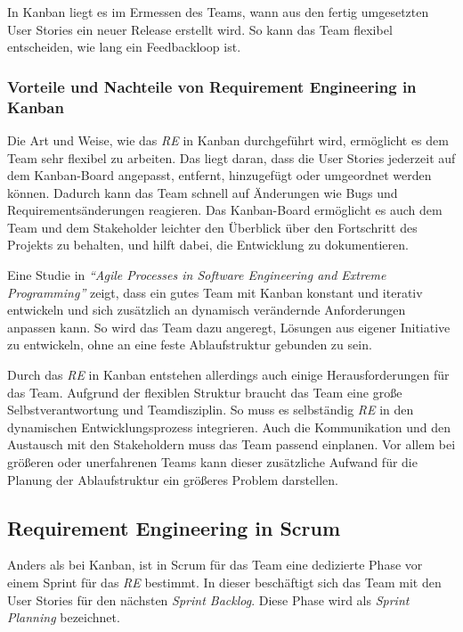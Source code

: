 \documentclass[acmtog]{acmart}
\begin{document}
In Kanban liegt es im Ermessen des Teams, wann aus den fertig umgesetzten User Stories ein neuer Release 
erstellt wird. So kann das Team flexibel entscheiden, wie lang ein Feedbackloop ist. \cite{agileprocesses}

\subsubsection{Vorteile und Nachteile von Requirement Engineering in Kanban}

Die Art und Weise, wie das \emph{RE} in Kanban durchgeführt wird, ermöglicht es dem Team sehr flexibel zu arbeiten. 
Das liegt daran, dass die User Stories jederzeit auf dem Kanban-Board angepasst, entfernt, 
hinzugefügt oder umgeordnet werden können. Dadurch kann das Team schnell auf Änderungen wie Bugs und Requirementsänderungen 
reagieren. Das Kanban-Board ermöglicht es auch dem Team und dem Stakeholder leichter den Überblick über den 
Fortschritt des Projekts zu behalten, und hilft dabei, die Entwicklung zu dokumentieren.

Eine Studie in \emph{``Agile Processes in Software Engineering and Extreme Programming''} \cite{agileprocesses} zeigt, dass ein gutes Team mit Kanban konstant und iterativ entwickeln und sich zusätzlich 
an dynamisch verändernde Anforderungen anpassen kann. So wird das Team dazu angeregt, Lösungen aus eigener 
Initiative zu entwickeln, ohne an eine feste Ablaufstruktur gebunden zu sein. \cite{reqkanban}

Durch das \emph{RE} in Kanban entstehen allerdings auch einige Herausforderungen für das Team. Aufgrund der flexiblen 
Struktur braucht das Team eine große Selbstverantwortung und Teamdisziplin. So muss es selbständig \emph{RE} in den 
dynamischen Entwicklungsprozess integrieren. Auch die Kommunikation und den Austausch mit den Stakeholdern muss 
das Team passend einplanen. Vor allem bei größeren oder unerfahrenen Teams kann dieser zusätzliche Aufwand für 
die Planung der Ablaufstruktur ein größeres Problem darstellen. \cite{kanbannod}

\subsection{Requirement Engineering in Scrum}

Anders als bei Kanban, ist in Scrum für das Team eine dedizierte Phase vor einem Sprint für das \emph{RE} bestimmt. In dieser 
beschäftigt sich das Team mit den User Stories für den nächsten \emph{Sprint Backlog}. Diese Phase wird als \emph{Sprint Planning} bezeichnet. \cite{reinscrum}
\end{document}
